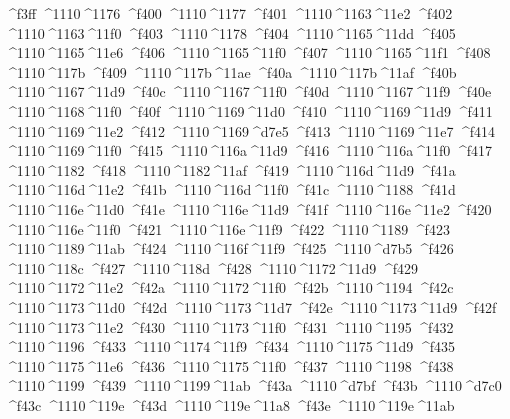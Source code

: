 \checkit ^^^^f3ff ^^^^1110^^^^1176
\checkit ^^^^f400 ^^^^1110^^^^1177
\checkit ^^^^f401 ^^^^1110^^^^1163^^^^11e2
\checkit ^^^^f402 ^^^^1110^^^^1163^^^^11f0
\checkit ^^^^f403 ^^^^1110^^^^1178
\checkit ^^^^f404 ^^^^1110^^^^1165^^^^11dd
\checkit ^^^^f405 ^^^^1110^^^^1165^^^^11e6
\checkit ^^^^f406 ^^^^1110^^^^1165^^^^11f0
\checkit ^^^^f407 ^^^^1110^^^^1165^^^^11f1
\checkit ^^^^f408 ^^^^1110^^^^117b
\checkit ^^^^f409 ^^^^1110^^^^117b^^^^11ae
\checkit ^^^^f40a ^^^^1110^^^^117b^^^^11af
\checkit ^^^^f40b ^^^^1110^^^^1167^^^^11d9
\checkit ^^^^f40c ^^^^1110^^^^1167^^^^11f0
\checkit ^^^^f40d ^^^^1110^^^^1167^^^^11f9
\checkit ^^^^f40e ^^^^1110^^^^1168^^^^11f0
\checkit ^^^^f40f ^^^^1110^^^^1169^^^^11d0
\checkit ^^^^f410 ^^^^1110^^^^1169^^^^11d9
\checkit ^^^^f411 ^^^^1110^^^^1169^^^^11e2
\checkit ^^^^f412 ^^^^1110^^^^1169^^^^d7e5
\checkit ^^^^f413 ^^^^1110^^^^1169^^^^11e7
\checkit ^^^^f414 ^^^^1110^^^^1169^^^^11f0
\checkit ^^^^f415 ^^^^1110^^^^116a^^^^11d9
\checkit ^^^^f416 ^^^^1110^^^^116a^^^^11f0
\checkit ^^^^f417 ^^^^1110^^^^1182
\checkit ^^^^f418 ^^^^1110^^^^1182^^^^11af
\checkit ^^^^f419 ^^^^1110^^^^116d^^^^11d9
\checkit ^^^^f41a ^^^^1110^^^^116d^^^^11e2
\checkit ^^^^f41b ^^^^1110^^^^116d^^^^11f0
\checkit ^^^^f41c ^^^^1110^^^^1188
\checkit ^^^^f41d ^^^^1110^^^^116e^^^^11d0
\checkit ^^^^f41e ^^^^1110^^^^116e^^^^11d9
\checkit ^^^^f41f ^^^^1110^^^^116e^^^^11e2
\checkit ^^^^f420 ^^^^1110^^^^116e^^^^11f0
\checkit ^^^^f421 ^^^^1110^^^^116e^^^^11f9
\checkit ^^^^f422 ^^^^1110^^^^1189
\checkit ^^^^f423 ^^^^1110^^^^1189^^^^11ab
\checkit ^^^^f424 ^^^^1110^^^^116f^^^^11f9
\checkit ^^^^f425 ^^^^1110^^^^d7b5
\checkit ^^^^f426 ^^^^1110^^^^118c
\checkit ^^^^f427 ^^^^1110^^^^118d
\checkit ^^^^f428 ^^^^1110^^^^1172^^^^11d9
\checkit ^^^^f429 ^^^^1110^^^^1172^^^^11e2
\checkit ^^^^f42a ^^^^1110^^^^1172^^^^11f0
\checkit ^^^^f42b ^^^^1110^^^^1194
\checkit ^^^^f42c ^^^^1110^^^^1173^^^^11d0
\checkit ^^^^f42d ^^^^1110^^^^1173^^^^11d7
\checkit ^^^^f42e ^^^^1110^^^^1173^^^^11d9
\checkit ^^^^f42f ^^^^1110^^^^1173^^^^11e2
\checkit ^^^^f430 ^^^^1110^^^^1173^^^^11f0
\checkit ^^^^f431 ^^^^1110^^^^1195
\checkit ^^^^f432 ^^^^1110^^^^1196
\checkit ^^^^f433 ^^^^1110^^^^1174^^^^11f9
\checkit ^^^^f434 ^^^^1110^^^^1175^^^^11d9
\checkit ^^^^f435 ^^^^1110^^^^1175^^^^11e6
\checkit ^^^^f436 ^^^^1110^^^^1175^^^^11f0
\checkit ^^^^f437 ^^^^1110^^^^1198
\checkit ^^^^f438 ^^^^1110^^^^1199
\checkit ^^^^f439 ^^^^1110^^^^1199^^^^11ab
\checkit ^^^^f43a ^^^^1110^^^^d7bf
\checkit ^^^^f43b ^^^^1110^^^^d7c0
\checkit ^^^^f43c ^^^^1110^^^^119e
\checkit ^^^^f43d ^^^^1110^^^^119e^^^^11a8
\checkit ^^^^f43e ^^^^1110^^^^119e^^^^11ab
